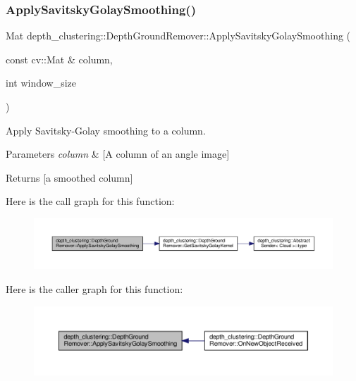 \subsubsection{\texorpdfstring{Apply\+Savitsky\+Golay\+Smoothing()}{ApplySavitskyGolaySmoothing()}}
{\footnotesize\ttfamily Mat depth\+\_\+clustering\+::\+Depth\+Ground\+Remover\+::\+Apply\+Savitsky\+Golay\+Smoothing (\begin{DoxyParamCaption}\item[{const cv\+::\+Mat \&}]{column,  }\item[{int}]{window\+\_\+size }\end{DoxyParamCaption})\hspace{0.3cm}{\ttfamily [protected]}}



Apply Savitsky-\/\+Golay smoothing to a column. 


\begin{DoxyParams}{Parameters}
{\em column} & \mbox{[}A column of an angle image\mbox{]} \\
\hline
\end{DoxyParams}
\begin{DoxyReturn}{Returns}
\mbox{[}a smoothed column\mbox{]} 
\end{DoxyReturn}
Here is the call graph for this function\+:\nopagebreak
\begin{figure}[H]
\begin{center}
\leavevmode
\includegraphics[width=350pt]{classdepth__clustering_1_1DepthGroundRemover_a63b32fa801a13021bf22699525579f8b_cgraph}
\end{center}
\end{figure}
Here is the caller graph for this function\+:\nopagebreak
\begin{figure}[H]
\begin{center}
\leavevmode
\includegraphics[width=350pt]{classdepth__clustering_1_1DepthGroundRemover_a63b32fa801a13021bf22699525579f8b_icgraph}
\end{center}
\end{figure}
\mbox{\label{classdepth__clustering_1_1DepthGroundRemover_af533c51a44aad9a56c12445b61b801b9}} 
